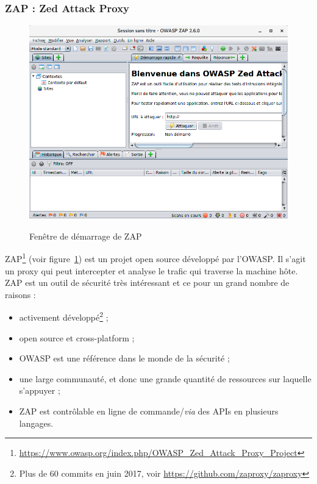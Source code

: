\subsubsection{ZAP : Zed Attack Proxy}
\begin{figure}
  {\includegraphics[width=\textwidth]{images/zap_acceuil}}
  \centering
  \caption{Fenêtre de démarrage de ZAP}
  \label{fig:zap_acceuil}
\end{figure}
ZAP\footnote{\url{https://www.owasp.org/index.php/OWASP_Zed_Attack_Proxy_Project}} (voir figure~\ref{fig:zap_acceuil}) est un projet open source développé par l'OWASP. Il s'agit un proxy qui peut intercepter et analyse le trafic qui traverse la machine hôte. ZAP est un outil de sécurité très intéressant et ce pour un grand nombre de raisons :
\begin{itemize}[label=$\bullet$]
\item activement développé\footnote{Plus de 60 commits en juin 2017, voir \url{https://github.com/zaproxy/zaproxy}} ;
\item open source et cross-platform ;
\item OWASP est une référence dans le monde de la sécurité ;
\item une large communauté, et donc une grande quantité de ressources sur laquelle s'appuyer ;
\item ZAP est contrôlable en ligne de commande/\textit{via} des APIs en plusieurs langages.
\end{itemize}

